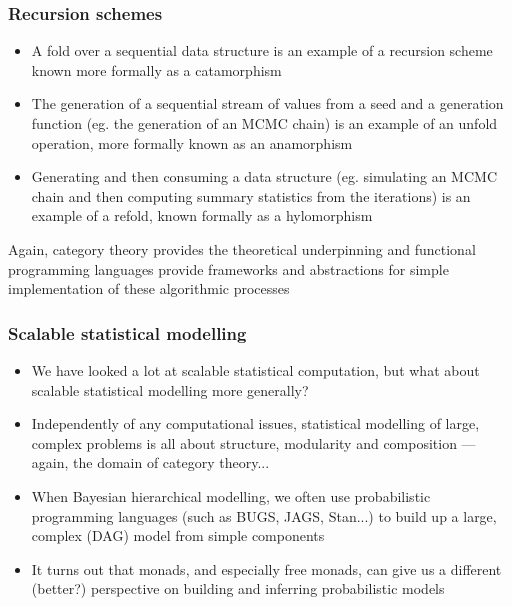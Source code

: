 \documentclass[mathserif,handout]{beamer}
\begin{document}
\begin{frame}
  \frametitle{Recursion schemes}
  \begin{itemize}
  \item A \alert{fold} over a sequential data structure is an example of a recursion scheme known more formally as a \alert{catamorphism}
  \item The generation of a sequential stream of values from a seed and a generation function (eg. the generation of an MCMC chain) is an example of an \alert{unfold} operation, more formally known as an \alert{anamorphism}
    \item Generating and then consuming a data structure (eg. simulating an MCMC chain and then computing summary statistics from the iterations) is an example of a \alert{refold}, known formally as a \alert{hylomorphism}
  \end{itemize}
  Again, category theory provides the theoretical underpinning and functional programming languages provide frameworks and abstractions for simple implementation of these algorithmic processes
\end{frame}



\begin{frame}[fragile]
  \frametitle{Scalable statistical modelling}
  \begin{itemize}
  \item We have looked a lot at scalable statistical \alert{computation}, but what about scalable statistical \alert{modelling} more generally?
  \item Independently of any computational issues, statistical modelling of large, complex problems is all about structure, modularity and composition --- again, the domain of category theory...
  \item When Bayesian hierarchical modelling, we often use \alert{probabilistic programming languages} (such as BUGS, JAGS, Stan...) to build up a large, complex (DAG) model from simple components
    \item It turns out that \alert{monads}, and especially \alert{free monads}, can give us a different (better?) perspective on building and inferring probabilistic models
  \end{itemize}
\end{frame}
\end{document}
